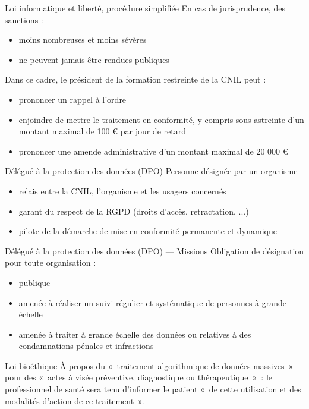 \begin{frame}{Loi informatique et liberté, procédure simplifiée}
  En cas de jurisprudence, des sanctions :
  \begin{itemize}
    \item moins nombreuses et moins sévères
    \item ne peuvent jamais être rendues publiques
  \end{itemize}
  Dans ce cadre, le président de la formation restreinte de la CNIL peut :
  \begin{itemize}
      \item prononcer un rappel à l’ordre 
      \item enjoindre de mettre le traitement en conformité, 
            y compris sous astreinte d’un montant maximal de 100 € par jour de retard 
      \item prononcer une amende administrative d’un montant maximal de 20 000 €
  \end{itemize}
\end{frame}

\begin{frame}{Délégué à la protection des données (DPO)}
  Personne désignée par un organisme
  \begin{itemize}
    \item relais entre la CNIL, l’organisme et les usagers concernés
    \item garant du respect de la RGPD (droits d’accès, retractation, ...)
    \item pilote de la démarche de mise en conformité permanente et dynamique
  \end{itemize}
\end{frame}

\begin{frame}{Délégué à la protection des données (DPO) --- Missions}
  Obligation de désignation pour toute organisation :
  \begin{itemize}
    \item publique
    \item amenée à réaliser un suivi régulier et systématique de personnes à grande échelle
    \item amenée à traiter à grande échelle des données 
          ou relatives à des condamnations pénales et infractions
  \end{itemize}
\end{frame}

\begin{frame}{Loi bioéthique}
  À propos du «~traitement algorithmique de données massives~» pour des 
  «~actes à visée préventive, diagnostique ou thérapeutique~»~: 
  le professionnel de santé sera tenu d’informer le patient 
  «~de cette utilisation et des modalités d’action de ce traitement~».
\end{frame}
